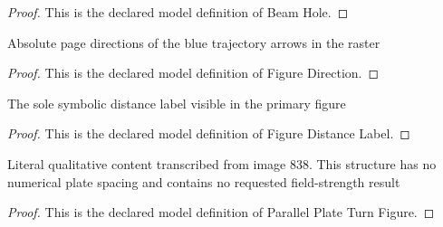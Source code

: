 \begin{proof}
  This is the declared model definition of Beam Hole.
\end{proof}
\begin{definition}
  \label{def:physics:phyx-mini-0838:phyxminiproblems-problemphyxmini0838-figuredirection}
  Absolute page directions of the blue trajectory arrows in the raster
\end{definition}
\begin{proof}
  This is the declared model definition of Figure Direction.
\end{proof}
\begin{definition}
  \label{def:physics:phyx-mini-0838:phyxminiproblems-problemphyxmini0838-figuredistancelabel}
  The sole symbolic distance label visible in the primary figure
\end{definition}
\begin{proof}
  This is the declared model definition of Figure Distance Label.
\end{proof}
\begin{definition}
  \label{def:physics:phyx-mini-0838:phyxminiproblems-problemphyxmini0838-parallelplateturnfigure}
  Literal qualitative content transcribed from image 838. This structure has no numerical plate spacing and contains no requested field-strength result
\end{definition}
\begin{proof}
  This is the declared model definition of Parallel Plate Turn Figure.
\end{proof}
